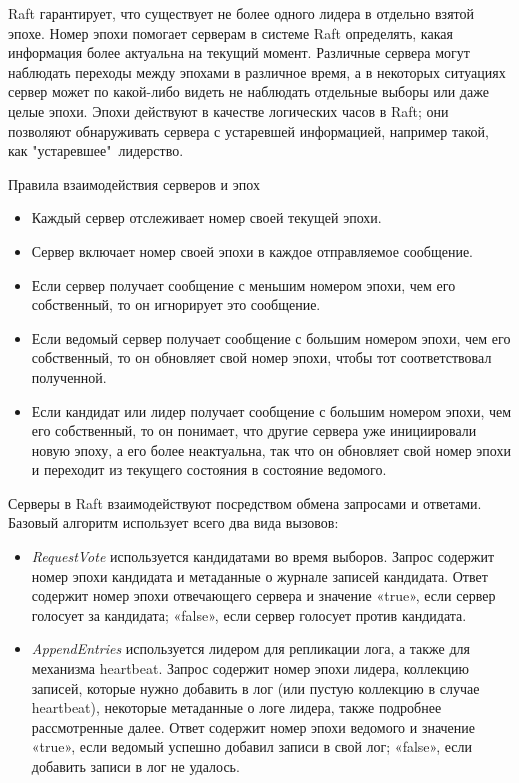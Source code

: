 \documentclass[subf, href, colorlinks=true, 14pt,
times, mtpro, specialist]{disser}
\theoremstyle{definition}
\begin{document}
Raft гарантирует, что существует не более одного лидера в отдельно взятой эпохе.
Номер эпохи помогает серверам в системе Raft определять, какая информация более актуальна на текущий момент. 
Различные сервера могут наблюдать переходы между эпохами в различное время, а в некоторых ситуациях сервер может по какой-либо видеть не наблюдать отдельные выборы или даже целые эпохи. Эпохи действуют в качестве логических часов в Raft; они позволяют обнаруживать сервера с устаревшей информацией, например такой, как "устаревшее"\ лидерство.

Правила взаимодействия серверов и эпох
\begin{itemize}
\item Каждый сервер отслеживает номер своей текущей эпохи.
\item Сервер включает номер своей эпохи в каждое отправляемое сообщение.
\item Если сервер получает сообщение с меньшим номером эпохи, чем его собственный, то он игнорирует это сообщение.
\item Если ведомый сервер получает сообщение с большим номером эпохи, чем его собственный, то он обновляет свой номер эпохи, чтобы тот соответствовал полученной.
\item Если кандидат или лидер получает сообщение с большим номером эпохи, чем его собственный, то он понимает, что другие сервера уже инициировали новую эпоху, а его более неактуальна, так что он обновляет свой номер эпохи и переходит из текущего состояния в состояние ведомого.
\end{itemize}

Серверы в Raft взаимодействуют посредством обмена запросами и ответами. Базовый алгоритм использует всего два вида вызовов: 
\begin{itemize}
\item \emph{RequestVote} используется кандидатами во время выборов. Запрос содержит номер эпохи кандидата и метаданные о журнале записей кандидата. Ответ содержит номер эпохи отвечающего сервера и значение «true», если сервер голосует за кандидата; «false», если сервер голосует против кандидата.
\item \emph{AppendEntries} используется лидером для репликации лога, а также для механизма heartbeat. Запрос содержит номер эпохи лидера, коллекцию записей, которые нужно добавить в лог (или пустую коллекцию в случае heartbeat), некоторые метаданные о логе лидера, также подробнее рассмотренные далее. Ответ содержит номер эпохи ведомого и значение «true», если ведомый успешно добавил записи в свой лог; «false», если добавить записи в лог не удалось.
\end{itemize}
\end{document}
